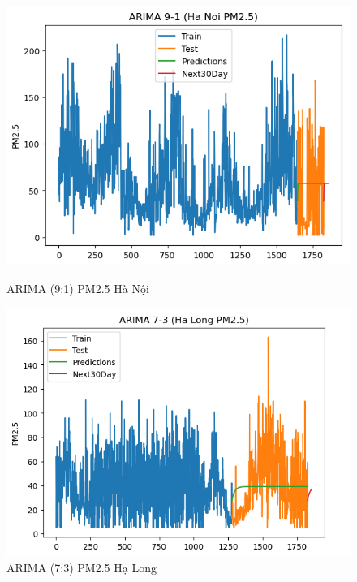 \begin{figure}[h]
    \begin{minipage}[b]{0.45\linewidth}
        \centering
        \includegraphics[width=\linewidth]{img/ARIMA_9_1_HN.png}
        \caption{\scriptsize ARIMA (9:1) PM2.5 Hà Nội}
        \label{fig1}
    \end{minipage}\hfill
    \begin{minipage}[b]{0.45\linewidth}
        \centering
        \includegraphics[width=\linewidth]{img/ARIMA_7_3_HL.png}
        \caption{\scriptsize ARIMA (7:3) PM2.5 Hạ Long}
        \label{fig2}
    \end{minipage}
    \begin{minipage}[b]{0.45\linewidth}
        \centering

\end{minipage}
\end{figure}

